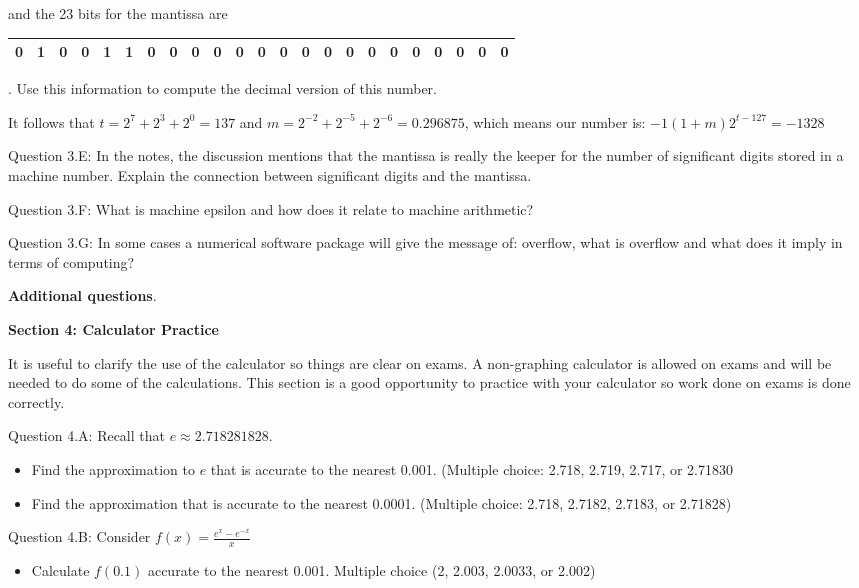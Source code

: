 \documentclass{article}
\def\ds{\displaystyle}
\begin{document}
and the 23 bits for the mantissa are \par \noindent
 \begin{tabular}{|c|c|c|c|c|c|c|c|c|c|c|c|c|c|c|c|c|c|c|c|c|c|c|}
\hline
0 & 1 & 0 & 0 & 1 & 1 & 0 & 0 & 0 & 0 &  0 & 0& 0  & 0 & 0 & 0 & 0 & 0 & 0 & 0 & 0 & 0 & 0\\
\hline
\end{tabular}. Use this information to compute the decimal version of this number.

{\color{teal} It follows that $\ds t=2^7+2^3+2^0=137$ and $\ds m=2^{-2}+2^{-5}+2^{-6}=0.296875$, which means our number is: $\ds -1(1+m)2^{t-127}=-1328$} 
\medskip \par \noindent
%
Question 3.E: In the notes, the discussion mentions that the mantissa is really the keeper for the number of significant digits stored in a machine number. Explain the connection between significant digits and the mantissa. 
\medskip \par \noindent
%
Question 3.F: What is machine epsilon and how does it relate to machine arithmetic?
\medskip \par \noindent
%
Question 3.G: In some cases a numerical software package will give the message of: overflow, what is overflow and what does it imply in terms of computing?
%
\bigskip \par \noindent
%
{\bf Additional questions}. \medskip \par \noindent
{\bf Section 4: Calculator Practice}
\medskip \par \noindent
It is useful to clarify the use of the calculator so things are clear on exams. A non-graphing calculator is allowed on exams and will be needed to do some of the calculations. This section is a good opportunity to practice with your calculator so work done on exams is done correctly. \medskip \par \noindent
Question 4.A: Recall that $e \approx 2.718281828$. 
\begin{itemize}
    \item Find the approximation to $e$ that is accurate to the nearest 0.001. (Multiple choice: 2.718, 2.719, 2.717, or 2.71830
    \item Find the approximation that is accurate to the nearest 0.0001. (Multiple choice: 2.718, 2.7182, 2.7183, or 2.71828)
\end{itemize}
\medskip \par \noindent
Question 4.B: Consider $\ds f(x) =\frac {e^x - e^{-x}}x$
\begin{itemize}
    \item Calculate $f(0.1)$ accurate to the nearest 0.001. Multiple choice (2, 2.003, 2.0033, or 2.002)
\end{itemize} \medskip \par \noindent 
\end{document}
